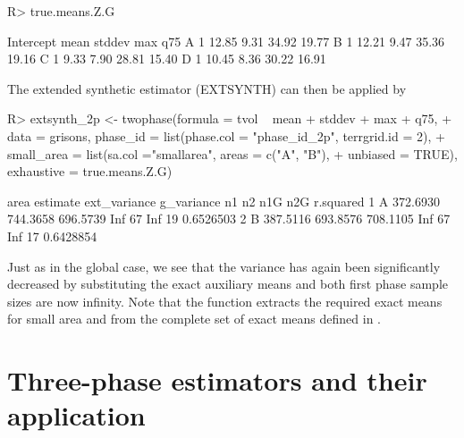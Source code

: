 \documentclass[article]{jss}
\begin{document}
\begin{Schunk}
\begin{Sinput}
R> true.means.Z.G
\end{Sinput}
\begin{Soutput}
  Intercept  mean stddev   max   q75
A         1 12.85   9.31 34.92 19.77
B         1 12.21   9.47 35.36 19.16
C         1  9.33   7.90 28.81 15.40
D         1 10.45   8.36 30.22 16.91
\end{Soutput}
\end{Schunk}


The extended synthetic estimator (EXTSYNTH) can then be applied by

\begin{Schunk}
\begin{Sinput}
R> extsynth_2p <- twophase(formula = tvol ~ mean + stddev + max + q75, 
+    data = grisons, phase_id = list(phase.col = "phase_id_2p", terrgrid.id = 2),
+    small_area = list(sa.col ="smallarea", areas = c("A", "B"),
+    unbiased = TRUE), exhaustive = true.means.Z.G)
\end{Sinput}
\end{Schunk}



\begin{Schunk}
\begin{Soutput}
  area estimate ext_variance g_variance  n1 n2 n1G n2G r.squared
1    A 372.6930     744.3658   696.5739 Inf 67 Inf  19 0.6526503
2    B 387.5116     693.8576   708.1105 Inf 67 Inf  17 0.6428854
\end{Soutput}
\end{Schunk}


Just as in the global case, we see that the variance has again been significantly decreased by substituting the exact auxiliary means and both first phase sample sizes are now infinity. Note that the function extracts the required exact means for small area  and  from the complete set of exact means defined in .

\newpage



\section{Three-phase estimators and their application}
\label{sec:threephase_and_appl}
\end{document}
